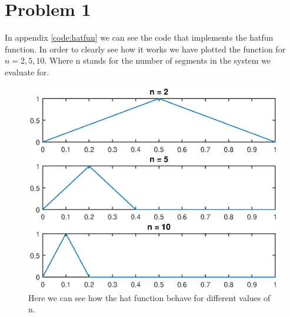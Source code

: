\documentclass[11pt]{article}
\begin{document}
\section{Problem 1}
In appendix \ref{code:hatfun} we can see the code that implements the hatfun function. In order to clearly see how it works we have plotted the function for $n = 2,5,10$. Where n stands for the number of segments in the system we evaluate for. 
\begin{figure}[H]
	\centering
	\includegraphics[width=1\textwidth]{../ex1/hatplot}
	\caption{Here we can see how the hat function behave for different values of n.}
	\label{fig:hatplot}
\end{figure}
\end{document}
